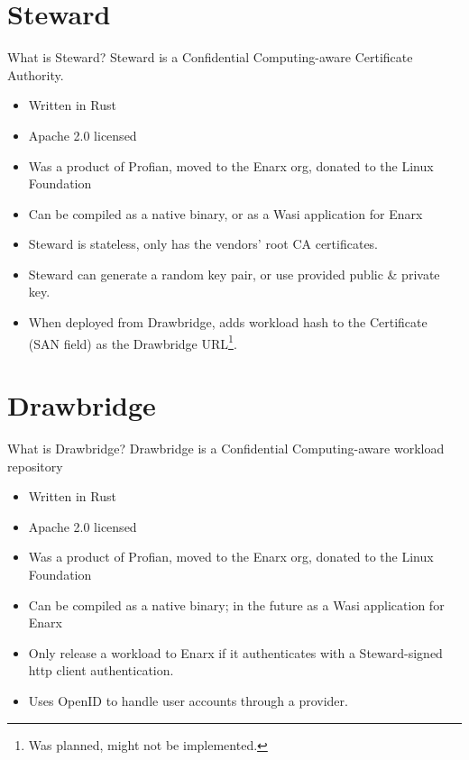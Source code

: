 \documentclass[graphics]{beamer}
\begin{document}
\section{Steward}
\begin{frame}{What is Steward?}
Steward is a Confidential Computing-aware Certificate Authority.
\begin{itemize}
    \item Written in Rust
    \item Apache 2.0 licensed
    \item Was a product of Profian, moved to the Enarx org, donated to the Linux Foundation
    \item Can be compiled as a native binary, or as a Wasi application for Enarx
    \item Steward is stateless, only has the vendors' root CA certificates.
    \item Steward can generate a random key pair, or use provided public \& private key.
    \item When deployed from Drawbridge, adds workload hash to the Certificate (SAN field) as the Drawbridge URL\footnote{Was planned, might not be implemented.}.
\end{itemize}
\end{frame}

\section{Drawbridge}
\begin{frame}{What is Drawbridge?}
Drawbridge is a Confidential Computing-aware workload repository
\begin{itemize}
    \item Written in Rust
    \item Apache 2.0 licensed
    \item Was a product of Profian, moved to the Enarx org, donated to the Linux Foundation
    \item Can be compiled as a native binary; in the future as a Wasi application for Enarx
    \item Only release a workload to Enarx if it authenticates with a Steward-signed http client authentication.
    \item Uses OpenID to handle user accounts through a provider.
\end{itemize}
\end{frame}
\end{document}

